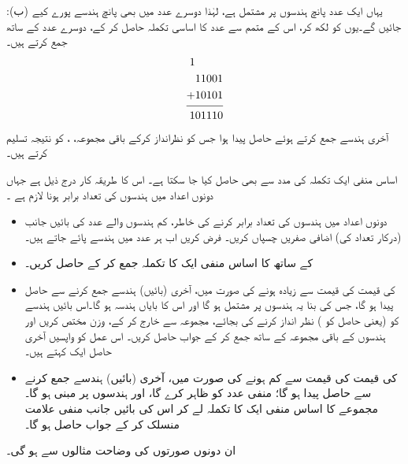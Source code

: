:\quad  (ب) یہاں ایک عدد پانچ ہندسوں پر مشتمل  ہے،  لہٰذا دوسرے عدد  میں بھی  پانچ ہندسے پورے  کیے  جائیں گے۔یوں    کو  لکھ کر،  اس  کے   متمم 
  سے  عدد کا اساسی تکملہ  حاصل کر  کے،  دوسرے عدد کے ساتھ جمع کرتے ہیں۔
\begin{align*}
\begin{split}
1\phantom{11001}&\\
11001&\\
+10101&\\
\noalign{\smallskip}\hline\noalign{\smallskip}
101110&
\end{split}
\end{align*}
آخری ہندسے جمع کرتے ہوئے حاصل  پیدا ہوا جس کو نظرانداز کرکے  باقی مجموعہ،   ، کو نتیجہ  تسلیم کرتے  ہیں۔


اساس منفی ایک تکملہ  کی مدد سے بھی       حاصل کیا جا سکتا ہے۔ اس کا  طریقہ کار  درج ذیل ہے جہاں    دونوں اعداد میں ہندسوں کی تعداد برابر ہونا لازم ہے ۔
\begin{itemize}
    \item
     دونوں  اعداد میں ہندسوں کی تعداد   برابر  کرنے کی خاطر،  کم ہندسوں  والے   عدد کی بائیں جانب  (درکار تعداد کی) اضافی صفریں  چسپاں کریں۔ فرض کریں اب ہر عدد میں     ہندسے پائے جاتے ہیں۔ 
    \item
     کے ساتھ    کا اساس منفی ایک کا   تکملہ جمع کر کے       حاصل کریں۔
   \item
        کی قیمت    کی قیمت سے زیادہ ہونے کی صورت میں، آخری  (بائیں)  ہندسے جمع کرنے سے  حاصل   پیدا ہو  گا،        جس کی بنا  یہ    ہندسوں پر مشتمل  ہو گا اور اس کا  بایاں ہندسہ         ہو گا۔اس  بائیں ہندسے    کو (یعنی حاصل  کو )  نظر انداز کرنے کی بجائے،   مجموعہ سے خارج کر کے،   وزن مختص کریں اور   ہندسوں کے باقی مجموعہ کے ساتھ جمع کر کے جواب حاصل کریں۔ اس عمل کو واپسیں آخری حاصل ایک کہتے ہیں۔
    \item
{}کی قیمت   کی قیمت سے کم  ہونے کی صورت میں،  آخری  (بائیں)  ہندسے جمع کرنے سے  حاصل   پیدا    ہو  گا؛        منفی عدد کو ظاہر کرے گا، اور  ہندسوں  پر مبنی ہو گا۔مجموعے کا اساس منفی ایک کا   تکملہ لے کر اس کی بائیں جانب  منفی علامت  منسلک  کر کے  جواب  حاصل ہو گا۔
\end{itemize}
ان  دونوں صورتوں کی وضاحت مثالوں  سے ہو  گی۔ 

